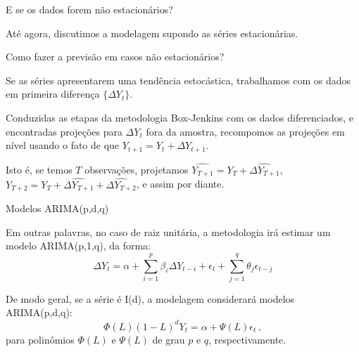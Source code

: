 \documentclass[11pt]{beamer}
\newenvironment{halfwideitemize}{\itemize\addtolength{\itemsep}{0.5em}}{\enditemize}
\begin{document}
\begin{frame}{E se os dados forem não estacionários?}
	\begin{halfwideitemize}
		\item Até agora, discutimos a modelagem supondo as séries estacionárias.
		\begin{halfwideitemize}
			\item Como fazer a previsão em casos não estacionários?
		\end{halfwideitemize}
		\item Se as séries apresentarem uma tendência estocástica, trabalhamos com os dados em primeira diferença $\{\Delta Y_t\}$. 
		
		\item Conduzidas as etapas da metodologia Box-Jenkins com os dados diferenciados, e encontradas projeções para $\Delta Y_t$ fora da amostra, recompomos as projeções  em nível usando o fato de que $Y_{t+1} = Y_t + \Delta Y_{t+1}$.
		\begin{halfwideitemize}
			\item Isto é, se temos $T$ observações, projetamos $\widehat{Y_{T+1}} = Y_T + \widehat{{\Delta Y_{T+1}}}$,  $Y_{T+2} = Y_T + \widehat{\Delta Y_{T+1}} + \widehat{\Delta Y_{T+2}}$, e assim por diante.
		\end{halfwideitemize}
		\end{halfwideitemize}
\end{frame}
\begin{frame}{Modelos ARIMA(p,d,q)}
	\begin{halfwideitemize}
				\item Em outras palavras, no caso de raiz unitária, a metodologia irá estimar um modelo {\color{blue}ARIMA(p,1,q)}, da forma:
		\begin{equation*}
			\Delta Y_t =\alpha + \sum_{i=1}^p \beta_i \Delta Y_{t-i} + \epsilon_t + \sum_{j=1}^q \theta_j \epsilon_{t-j}
		\end{equation*}
		\item De modo geral, se a série é I(d), a modelagem considerará modelos {\color{blue}ARIMA(p,d,q)}:
		$$\Phi(L)(1-L)^d Y_t =  \alpha + \Psi(L)\epsilon_t \, ,$$
		para polinômios $\Phi(L)$ e $\Psi(L)$ de grau $p$ e $q$, respectivamente.

	\end{halfwideitemize}
\end{frame}
\end{document}
